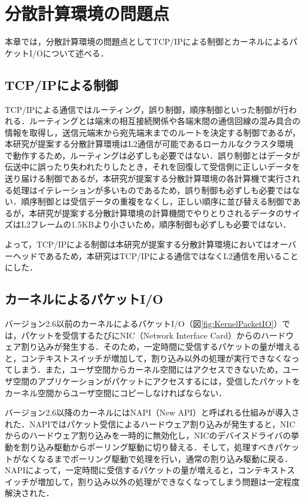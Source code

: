 \section{分散計算環境の問題点}
\label{sec:Problem}
本章では，分散計算環境の問題点としてTCP/IPによる制御とカーネルによるパケットI/Oについて述べる．

\subsection{TCP/IPによる制御}
TCP/IPによる通信ではルーティング，誤り制御，順序制御といった制御が行われる．ルーティングとは端末の相互接続関係や各端末間の通信回線の混み具合の情報を取得し，送信元端末から宛先端末までのルートを決定する制御であるが，本研究が提案する分散計算環境はL2通信が可能であるローカルなクラスタ環境で動作するため，ルーティングは必ずしも必要ではない．誤り制御とはデータが伝送中に誤ったり失われたりしたとき，それを回復して受信側に正しいデータを送り届ける制御であるが，本研究が提案する分散計算環境の各計算機で実行される処理はイテレーションが多いものであるため，誤り制御も必ずしも必要ではない．順序制御とは受信データの重複をなくし，正しい順序に並び替える制御であるが，本研究が提案する分散計算環境の計算機間でやりとりされるデータのサイズはL2フレームの1.5KBより小さいため，順序制御も必ずしも必要ではない．

よって，TCP/IPによる制御は本研究が提案する分散計算環境においてはオーバーヘッドであるため，本研究はTCP/IPによる通信ではなくL2通信を用いることにした．

\subsection{カーネルによるパケットI/O}
バージョン2.6以前のカーネルによるパケットI/O（図\ref{fig:KernelPacketIO}）では，パケットを受信するたびにNIC（Network Interface Card）からのハードウェア割り込みが発生する．そのため，一定時間に受信するパケットの量が増えると，コンテキストスイッチが増加して，割り込み以外の処理が実行できなくなってしまう．また，ユーザ空間からカーネル空間にはアクセスできないため，ユーザ空間のアプリケーションがパケットにアクセスするには，受信したパケットをカーネル空間からユーザ空間にコピーしなければならない．

バージョン2.6以降のカーネルにはNAPI（New API）と呼ばれる仕組みが導入された．NAPIではパケット受信によるハードウェア割り込みが発生すると，NICからのハードウェア割り込みを一時的に無効化し，NICのデバイスドライバの挙動を割り込み駆動からポーリング駆動に切り替える．そして，処理すべきパケットがなくなるまでポーリング駆動で処理を行い，通常の割り込み駆動に戻る．NAPIによって，一定時間に受信するパケットの量が増えると，コンテキストスイッチが増加して，割り込み以外の処理ができなくなってしまう問題は一定程度解決された．

